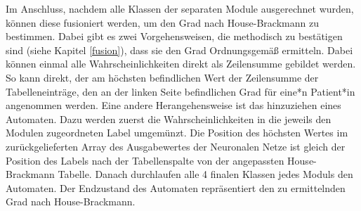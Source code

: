 Im Anschluss, nachdem alle Klassen der separaten Module ausgerechnet wurden, können diese fusioniert werden, um den Grad nach House-Brackmann zu bestimmen. Dabei gibt es zwei Vorgehensweisen, die methodisch zu bestätigen sind (siehe Kapitel \ref{fusion}), dass sie den Grad Ordnungsgemäß ermitteln. Dabei können einmal alle Wahrscheinlichkeiten direkt als Zeilensumme gebildet werden. So kann direkt, der am höchsten befindlichen Wert der Zeilensumme der Tabelleneinträge, den an der linken Seite befindlichen Grad für eine*n Patient*in angenommen werden. Eine andere Herangehensweise ist das hinzuziehen eines Automaten. Dazu werden zuerst die Wahrscheinlichkeiten in die jeweils den Modulen zugeordneten Label umgemünzt. Die Position des höchsten Wertes im zurückgelieferten Array des Ausgabewertes der Neuronalen Netze ist gleich der Position des Labels nach der Tabellenspalte von der angepassten House-Brackmann Tabelle. Danach durchlaufen alle 4 finalen Klassen jedes Moduls den Automaten. Der Endzustand des Automaten repräsentiert den zu ermittelnden Grad nach House-Brackmann.



